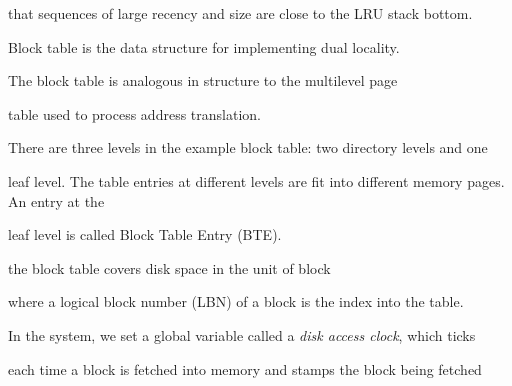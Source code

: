 \documentclass[12pt]{article}
\begin{document}
\setlength{\parskip}{8.04pt}
{\fontsize{10pt}{12.0pt}\selectfont that sequences of large recency and size are close to the LRU stack bottom.\par}\par

{\fontsize{10pt}{12.0pt}\selectfont Block table is the data structure for implementing dual locality.\par}\par

\setlength{\parskip}{0.0pt}
{\fontsize{10pt}{12.0pt}\selectfont The block table is analogous in structure to the multilevel page\par}\par

\setlength{\parskip}{8.04pt}
{\fontsize{10pt}{12.0pt}\selectfont table used to process address translation.\par}\par

\setlength{\parskip}{0.0pt}
{\fontsize{10pt}{12.0pt}\selectfont There are three levels in the example block table: two directory levels and one\par}\par

{\fontsize{10pt}{12.0pt}\selectfont leaf level. The table entries at different levels are fit into different memory pages. An entry at the\par}\par

\setlength{\parskip}{8.04pt}
{\fontsize{10pt}{12.0pt}\selectfont leaf level is called Block Table Entry (BTE).\par}\par

\setlength{\parskip}{0.0pt}
{\fontsize{10pt}{12.0pt}\selectfont the block table covers disk space in the unit of block\par}\par

\setlength{\parskip}{8.04pt}
{\fontsize{10pt}{12.0pt}\selectfont where a logical block number (LBN) of a block is the index into the table.\par}\par

\setlength{\parskip}{0.0pt}
{\fontsize{10pt}{12.0pt}\selectfont In the system, we set a global variable called a \textit{disk access clock}, which ticks\par}\par

{\fontsize{10pt}{12.0pt}\selectfont each time a block is fetched into memory and stamps the block being fetched\par}\par
\end{document}
